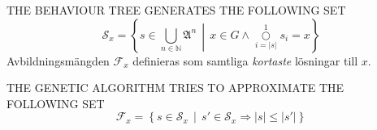 \documentclass[10pt,a4paper]{article}
\begin{document}
THE BEHAVIOUR TREE GENERATES THE FOLLOWING SET
\begin{equation}
		\mathscr{S}_x = \left\{ s \in \bigcup_{n\in \mathbb{N}}\mathfrak{A}^n \,\middle|\, x\in G\wedge\overset{1}{\underset{i=|s|}\bigcirc} s_i = x \right\}
\end{equation}
Avbildningsmängden \(\mathscr{F}_x\) definieras som samtliga \textit{kortaste} lösningar till \(x\).

THE GENETIC ALGORITHM TRIES TO APPROXIMATE THE FOLLOWING SET \begin{equation}
		\mathscr{F}_x=\left\{s\in\mathscr{S}_x \,\middle|\, s'\in \mathscr{S}_x \Rightarrow |s|\le|s'|\right\}
\end{equation}
\end{document}
